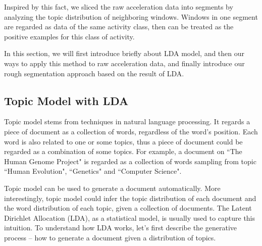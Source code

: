 \documentclass{sigchi}
\begin{document}
 Inspired by this fact, we sliced the raw acceleration data into segments by analyzing the topic distribution of neighboring windows.
 Windows in one segment are regarded as data of the same activity class, then can be treated as the positive examples for this class of activity.

 In this section, we will first introduce briefly about LDA model, and then our ways to apply this method to raw acceleration data, and finally introduce our rough segmentation approach based on the result of LDA.

\subsection{Topic Model with LDA}

    Topic model \cite{randell2000context} stems from techniques in natural language processing.
    It regards a piece of document as a collection of words, regardless of the word's position.
    Each word is also related to one or some topics, thus a piece of document could be regarded as a combination of some topics.
    For example, a document on ``The Human Genome Project" is regarded as a collection of words sampling from topic ``Human Evolution", ``Genetics" and ``Computer Science".

    Topic model can be used to generate a document automatically.
    More interestingly, topic model could infer the topic distribution of each document and the word distribution of each topic, given a collection of documents.
    The Latent Dirichlet Allocation (LDA), as a statistical model, is usually used to capture this intuition.
    To understand how LDA works, let's first describe the generative process -- how to generate a document given a distribution of topics.
\end{document}
